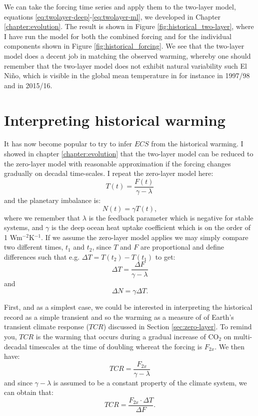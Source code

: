 \documentclass[12pt]{book}
\begin{document}
We can take the forcing time series and apply them to the two-layer model, equations \ref{eq:twolayer-deep}-\ref{eq:twolayer-ml}, we developed in Chapter \ref{chapter:evolution}. The result is shown in Figure \ref{fig:historical_two-layer}, where I have run the model for both the combined forcing and for the individual components shown in Figure \ref{fig:historical_forcing}. We see that the two-layer model does a decent job in matching the observed warming, whereby one should remember that the two-layer model does not exhibit natural variability such El Ni\~no, which is visible in the global mean temperature in for instance in 1997/98 and in 2015/16. 


\section{Interpreting historical warming}
It has now become popular to try to infer $ECS$ from the historical warming. 
I showed in chapter \ref{chapter:evolution} that the two-layer model can be reduced to the zero-layer model with reasonable approximation if the forcing changes gradually on decadal time-scales. I repeat the zero-layer model here:
$$T(t) = \frac{F(t)}{\gamma-\lambda}$$
and the planetary imbalance is:
$$N(t) = \gamma T(t),$$
where we remember that $\lambda$ is the feedback parameter which is negative for stable systems, and $\gamma$ is the deep ocean heat uptake coefficient which is on the order of 1 Wm$^{-2}$K$^{-1}$. If we assume the zero-layer model applies we may simply compare two different times, $t_1$ and $t_2$, since $T$ and $F$ are proportional and define differences such that e.g. $\Delta T = T(t_2)-T(t_1)$ to get:
\begin{equation}
\Delta T = \frac{\Delta F}{\gamma-\lambda}
\label{eq:hist_dT}
\end{equation}
and 
\begin{equation}
\Delta N = \gamma \Delta T.
\label{eq:hist_dN}
\end{equation}

\noindent
First, and as a simplest case, we could be interested in interpreting the historical record as a simple transient and so the warming as a measure of of Earth's transient climate response ($TCR$) discussed in Section \ref{sec:zero-layer}. To remind you, $TCR$ is the warming that occurs during a gradual increase of CO$_2$ on multi-decadal timescales at the time of doubling whereat the forcing is $F_{2x}$. We then have:
$$TCR = \frac{F_{2x}}{\gamma-\lambda}$$
and since $\gamma-\lambda$ is assumed to be a constant property of the climate system, we can obtain that:
\begin{equation}
TCR= \frac{F_{2x} \cdot \Delta T}{\Delta F}.
\label{eq:zero_tcr}
\end{equation}
\end{document}

